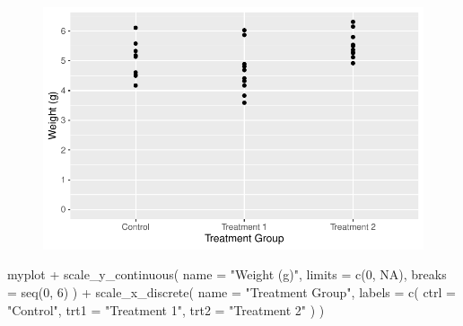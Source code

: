 \documentclass[
  letterpaper,
  DIV=11,
  numbers=noendperiod]{scrartcl}
\newenvironment{Shaded}{\begin{snugshade}}{\end{snugshade}}
\newcommand{\AttributeTok}[1]{\textcolor[rgb]{0.40,0.45,0.13}{#1}}
\newcommand{\ConstantTok}[1]{\textcolor[rgb]{0.56,0.35,0.01}{#1}}
\newcommand{\DecValTok}[1]{\textcolor[rgb]{0.68,0.00,0.00}{#1}}
\newcommand{\FunctionTok}[1]{\textcolor[rgb]{0.28,0.35,0.67}{#1}}
\newcommand{\NormalTok}[1]{\textcolor[rgb]{0.00,0.23,0.31}{#1}}
\newcommand{\SpecialCharTok}[1]{\textcolor[rgb]{0.37,0.37,0.37}{#1}}
\newcommand{\StringTok}[1]{\textcolor[rgb]{0.13,0.47,0.30}{#1}}
\begin{document}
\begin{figure}[H]

{\centering \includegraphics{ggplot2intro_files/figure-pdf/unnamed-chunk-12-1.pdf}

}

\end{figure}

\begin{Shaded}
\begin{Highlighting}[]
\NormalTok{myplot }\SpecialCharTok{+}
  \FunctionTok{scale\_y\_continuous}\NormalTok{(}
    \AttributeTok{name =} \StringTok{"Weight (g)"}\NormalTok{,}
    \AttributeTok{limits =} \FunctionTok{c}\NormalTok{(}\DecValTok{0}\NormalTok{, }\ConstantTok{NA}\NormalTok{),}
    \AttributeTok{breaks =} \FunctionTok{seq}\NormalTok{(}\DecValTok{0}\NormalTok{, }\DecValTok{6}\NormalTok{)}
\NormalTok{  ) }\SpecialCharTok{+}
  \FunctionTok{scale\_x\_discrete}\NormalTok{(}
    \AttributeTok{name =} \StringTok{"Treatment Group"}\NormalTok{,}
    \AttributeTok{labels =} \FunctionTok{c}\NormalTok{(}
      \AttributeTok{ctrl =} \StringTok{"Control"}\NormalTok{, }
      \AttributeTok{trt1 =} \StringTok{"Treatment 1"}\NormalTok{, }
      \AttributeTok{trt2 =} \StringTok{"Treatment 2"}
\NormalTok{    )}
\NormalTok{  )}
\end{Highlighting}
\end{Shaded}
\end{document}
